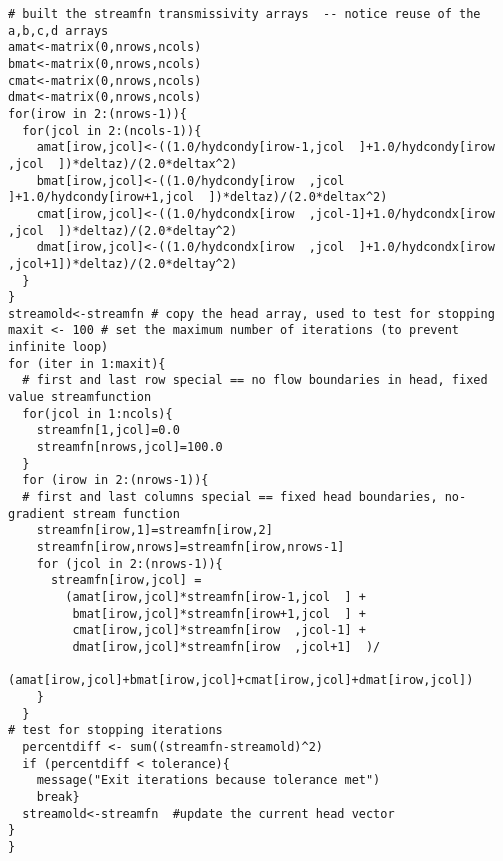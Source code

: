 \begin{lstlisting}[caption= R code demonstrating an Stream Function Simulator for 2D Steady Flow.  This code fragment implements the stream function \\ , label=lst:streamfunction]
# built the streamfn transmissivity arrays  -- notice reuse of the a,b,c,d arrays
amat<-matrix(0,nrows,ncols) 
bmat<-matrix(0,nrows,ncols) 
cmat<-matrix(0,nrows,ncols)
dmat<-matrix(0,nrows,ncols)
for(irow in 2:(nrows-1)){
  for(jcol in 2:(ncols-1)){
    amat[irow,jcol]<-((1.0/hydcondy[irow-1,jcol  ]+1.0/hydcondy[irow  ,jcol  ])*deltaz)/(2.0*deltax^2)
    bmat[irow,jcol]<-((1.0/hydcondy[irow  ,jcol  ]+1.0/hydcondy[irow+1,jcol  ])*deltaz)/(2.0*deltax^2)
    cmat[irow,jcol]<-((1.0/hydcondx[irow  ,jcol-1]+1.0/hydcondx[irow  ,jcol  ])*deltaz)/(2.0*deltay^2)
    dmat[irow,jcol]<-((1.0/hydcondx[irow  ,jcol  ]+1.0/hydcondx[irow  ,jcol+1])*deltaz)/(2.0*deltay^2)
  }
}
streamold<-streamfn # copy the head array, used to test for stopping 
maxit <- 100 # set the maximum number of iterations (to prevent infinite loop)
for (iter in 1:maxit){
  # first and last row special == no flow boundaries in head, fixed value streamfunction
  for(jcol in 1:ncols){
    streamfn[1,jcol]=0.0
    streamfn[nrows,jcol]=100.0
  }
  for (irow in 2:(nrows-1)){
  # first and last columns special == fixed head boundaries, no-gradient stream function
    streamfn[irow,1]=streamfn[irow,2]
    streamfn[irow,nrows]=streamfn[irow,nrows-1]
    for (jcol in 2:(nrows-1)){
      streamfn[irow,jcol] = 
        (amat[irow,jcol]*streamfn[irow-1,jcol  ] +
         bmat[irow,jcol]*streamfn[irow+1,jcol  ] +
         cmat[irow,jcol]*streamfn[irow  ,jcol-1] +
         dmat[irow,jcol]*streamfn[irow  ,jcol+1]  )/
        (amat[irow,jcol]+bmat[irow,jcol]+cmat[irow,jcol]+dmat[irow,jcol])
    }
  }
# test for stopping iterations
  percentdiff <- sum((streamfn-streamold)^2)
  if (percentdiff < tolerance){
    message("Exit iterations because tolerance met")
    break}
  streamold<-streamfn  #update the current head vector
}
}\end{lstlisting}
\clearpage

